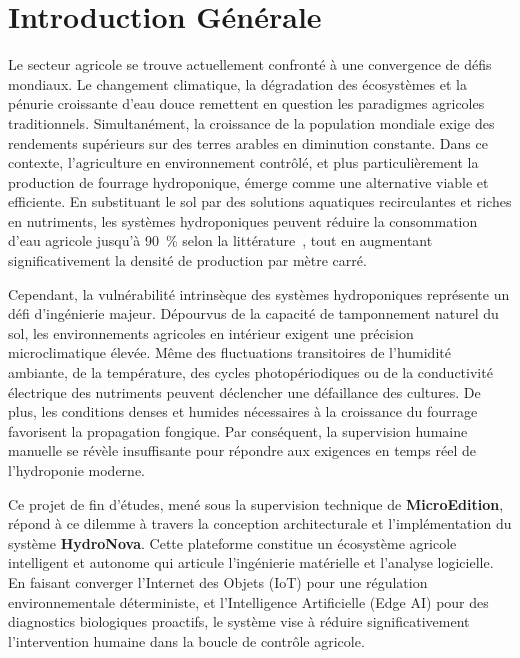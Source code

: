 \chapter*{Introduction Générale}

Le secteur agricole se trouve actuellement confronté à une convergence de défis mondiaux. Le changement climatique, la dégradation des écosystèmes et la pénurie croissante d'eau douce remettent en question les paradigmes agricoles traditionnels. Simultanément, la croissance de la population mondiale exige des rendements supérieurs sur des terres arables en diminution constante. Dans ce contexte, l'agriculture en environnement contrôlé, et plus particulièrement la production de fourrage hydroponique, émerge comme une alternative viable et efficiente. En substituant le sol par des solutions aquatiques recirculantes et riches en nutriments, les systèmes hydroponiques peuvent réduire la consommation d'eau agricole jusqu'à 90~\% selon la littérature~\cite{hydroponics_water}, tout en augmentant significativement la densité de production par mètre carré.

Cependant, la vulnérabilité intrinsèque des systèmes hydroponiques représente un défi d'ingénierie majeur. Dépourvus de la capacité de tamponnement naturel du sol, les environnements agricoles en intérieur exigent une précision microclimatique élevée. Même des fluctuations transitoires de l'humidité ambiante, de la température, des cycles photopériodiques ou de la conductivité électrique des nutriments peuvent déclencher une défaillance des cultures. De plus, les conditions denses et humides nécessaires à la croissance du fourrage favorisent la propagation fongique. Par conséquent, la supervision humaine manuelle se révèle insuffisante pour répondre aux exigences en temps réel de l'hydroponie moderne.

Ce projet de fin d'études, mené sous la supervision technique de \textbf{MicroEdition}, répond à ce dilemme à travers la conception architecturale et l'implémentation du système \textbf{HydroNova}. Cette plateforme constitue un écosystème agricole intelligent et autonome qui articule l'ingénierie matérielle et l'analyse logicielle. En faisant converger l'Internet des Objets (IoT) pour une régulation environnementale déterministe, et l'Intelligence Artificielle (Edge AI) pour des diagnostics biologiques proactifs, le système vise à réduire significativement l'intervention humaine dans la boucle de contrôle agricole.

